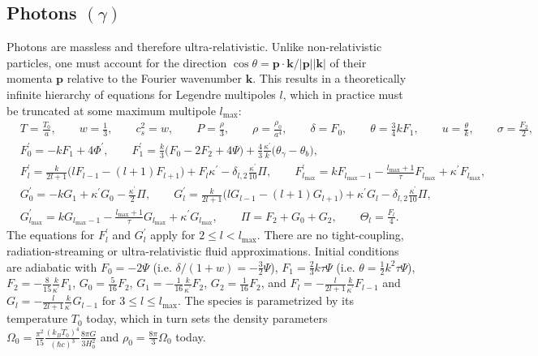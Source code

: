 \documentclass{aa}
\newcommand\lmax{l_\text{max}}
\begin{document}
\subsection{Photons \texorpdfstring{$(\gamma)$}{(γ)}}
\label{sec:photons}
Photons are massless and therefore ultra-relativistic.
Unlike non-relativistic particles, one must account for the direction $\cos\theta = \boldsymbol{p} \cdot \boldsymbol{k} / \lvert\boldsymbol{p}\rvert \lvert\boldsymbol{k}\rvert$ of their momenta $\boldsymbol{p}$ relative to the Fourier wavenumber $\boldsymbol{k}$.
This results in a theoretically infinite hierarchy of equations for Legendre multipoles $l$, which in practice must be truncated at some maximum multipole $\lmax$:
\begin{align*}
&
T = \frac{{T_0}}{a} , \qquad
w = \frac{1}{3} , \qquad
{c_s^2} = w , \qquad
P = \frac{\rho}{3} , \qquad
\rho = \frac{\rho_0}{a^{4}} , \qquad
\delta = F_0 , \qquad
\theta = \frac{3}{4} k F_{1} , \qquad
u = \frac{\theta}{k}, \qquad
\sigma = \frac{F_2}{2} , \\
&
F_0^\prime = - k F_1 + 4 \Phi^\prime , \qquad
F_1^\prime = \frac{k}{3} \big( F_0 - 2 F_2 + 4 \Psi \big) + \frac{4}{3} \frac{\kappa^\prime}{k} \big( \theta_\gamma - {\theta_b} \big), \\
&
F_l^\prime = \frac{k}{2l+1} \big( l F_{l-1} - (l+1) F_{l+1} \big) + F_{l} {\kappa^\prime} - \delta_{l,2}\frac{\kappa^\prime}{10} \Pi , \qquad
F_{\lmax}^\prime = k F_{\lmax-1} - \frac{\lmax+1}{\tau} F_{\lmax} + {\kappa^\prime} F_{\lmax} , \\
&
G_0^\prime =  - k G_{1} + {\kappa^\prime} {G_0} - \frac{\kappa^\prime}{2} \Pi , \qquad
G_{l}^\prime = \frac{k}{2l+1} \big( l G_{l-1} - (l+1) G_{l+1} \big) + \kappa^\prime G_{l} - \delta_{l,2} \frac{{\kappa^\prime}}{10} \Pi  ,  \\
&
G_{\lmax}^\prime = k G_{\lmax-1} - \frac{\lmax+1}{\tau} G_{\lmax} + {\kappa^\prime} G_{\lmax} , \qquad
\Pi = F_{2} + G_0 + G_{2} , \qquad
{{\Theta}_l} = \frac{F_l}{4} .
\end{align*}
The equations for $F_l^\prime$ and $G_l^\prime$ apply for $2 \leq l < \lmax$.
There are no tight-coupling, radiation-streaming or ultra-relativistic fluid approximations.
Initial conditions are adiabatic with $F_0 = -2\Psi$ (i.e. $\delta/(1+w) = -\frac32 \Psi$), $F_1 = \frac23 k\tau \Psi$ (i.e. $\theta = \frac12 k^2 \tau \Psi$), $F_2 = -\frac{8}{15} \frac{k}{\kappa^\prime} F_1$, $G_0 = \frac{5}{16} F_2$, $G_1 = -\frac{1}{16} \frac{k}{\kappa^\prime} F_2$, $G_2 = \frac{1}{16} F_2$, and $F_l = -\frac{l}{2l+1} \frac{k}{\kappa^\prime} F_{l-1}$ and $G_l = -\frac{l}{2l+1} \frac{k}{\kappa^\prime} G_{l-1}$ for $3 \leq l \leq \lmax$.
The species is parametrized by its temperature $T_0$ today, which in turn sets the density parameters $\Omega_0 = \frac{\pi^2}{15} \frac{(k_B T_0)^4}{(\hbar c)^3} \frac{8\pi G}{3H_0^2}$ and $\rho_0 = \frac{8\pi}{3}\Omega_0$ today.
\end{document}
